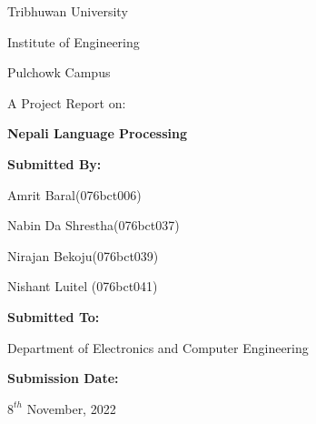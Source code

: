 \bigskip
\bigskip
\bigskip
\bigskip

\begin{center}

Tribhuwan University

Institute of Engineering

Pulchowk Campus

\bigskip
\bigskip
\bigskip
\bigskip

\noindent\makebox[\linewidth]
{\rule{15cm}{0.4pt}}
A Project Report on:

\textbf{\large Nepali Language Processing}
\noindent\makebox[\linewidth]
{\rule{15cm}{0.4pt}}

\bigskip
\bigskip
\bigskip
\bigskip
\textbf{Submitted By:}

Amrit Baral(076bct006)

Nabin Da Shrestha(076bct037)

Nirajan Bekoju(076bct039)

Nishant Luitel (076bct041)

\bigskip
\bigskip
\bigskip
\bigskip
\textbf{Submitted To:}

Department of Electronics and Computer Engineering

\bigskip
\bigskip
\bigskip
\bigskip
\textbf{Submission Date:} 

$8^{th}$ November, 2022

\end{center}
\clearpage